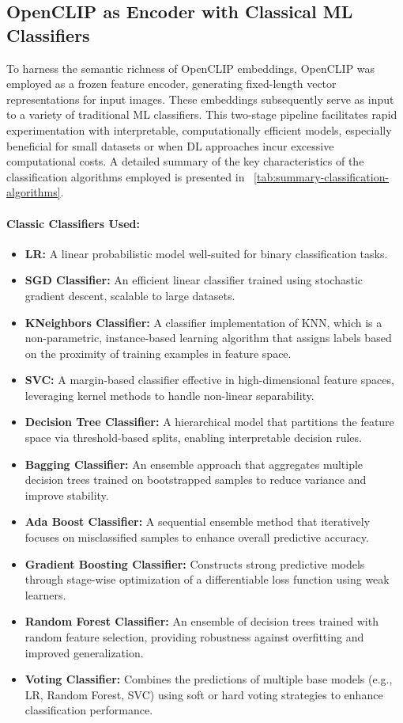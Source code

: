 \subsection{OpenCLIP as Encoder with Classical \ac{ML} Classifiers}
To harness the semantic richness of OpenCLIP embeddings,  OpenCLIP was employed as a frozen feature encoder, generating
fixed-length vector representations for input images. These embeddings subsequently serve as input to a variety of
traditional \ac{ML} classifiers. This two-stage pipeline facilitates rapid experimentation with interpretable,
computationally efficient models, especially beneficial for small datasets or when \ac{DL} approaches incur
excessive computational costs. A detailed summary of the key characteristics of the classification algorithms
employed is presented in ~\autoref{tab:summary-classification-algorithms}.

\paragraph{Classic Classifiers Used:}
\begin{itemize}
  \item \textbf{\ac{LR}:} A linear probabilistic model well-suited for binary classification tasks.
  \item \textbf{\ac{SGD} Classifier:} An efficient linear classifier trained using stochastic gradient descent,
  scalable to large datasets.
  \item \textbf{KNeighbors Classifier:} A classifier implementation of \ac{KNN}, which is a non-parametric,
  instance-based learning algorithm that assigns labels based on the proximity of training examples in feature space.
  \item \textbf{\ac{SVC}:} A margin-based classifier effective in high-dimensional feature spaces, leveraging kernel
  methods to handle non-linear separability.
  \item \textbf{Decision Tree Classifier:} A hierarchical model that partitions the feature space via
  threshold-based splits, enabling interpretable decision rules.
  \item \textbf{Bagging Classifier:} An ensemble approach that aggregates multiple decision trees trained on
  bootstrapped samples to reduce variance and improve stability.
  \item \textbf{Ada Boost Classifier:} A sequential ensemble method that iteratively focuses on misclassified samples
  to enhance overall predictive accuracy.
  \item \textbf{Gradient Boosting Classifier:} Constructs strong predictive models through stage-wise optimization
  of a differentiable loss function using weak learners.
  \item \textbf{Random Forest Classifier:} An ensemble of decision trees trained with random feature selection,
  providing robustness against overfitting and improved generalization.
  \item \textbf{Voting Classifier:} Combines the predictions of multiple base models (e.g., \ac{LR},
  Random Forest, \ac{SVC}) using soft or hard voting strategies to enhance classification performance.
\end{itemize}

